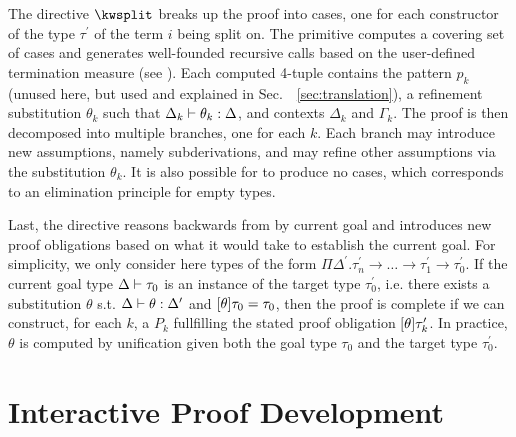 %

The directive $\kwsplit$ breaks up the proof into cases, one for each
constructor of the type $\tau^\prime$ of the term $i$ being split on.
The \scov{} primitive computes a covering set of cases and generates
well-founded recursive calls based on the user-defined termination measure
(see \cite{Pientka:TLCA15}).
Each computed 4-tuple contains the pattern $p_k$ (unused here, but used and
explained in Sec.~~\ref{sec:translation}), a refinement substitution $\theta_k$
such that $\Delta_k \vdash \theta_k : \Delta$, and contexts $\Delta_k$ and
$\Gamma_k$.
The proof is then decomposed into multiple branches, one for each $k$.
Each branch may introduce new assumptions, namely subderivations, and may refine
other assumptions via the substitution $\theta_k$.
It is also possible for \kwsplit{} to produce no cases, which corresponds to an
elimination principle for empty types.

Last, the \kwsuffices{} directive reasons backwards from by
current goal and introduces new proof obligations based on what it
would take to establish the current goal.
For simplicity, we only consider here types of the form
$\Pi \Delta^\prime.\tau_n^\prime \to \ldots \to \tau_1^\prime \to \tau_0^\prime$.
If the current goal type $\Delta \vdash \tau_0$ is an instance of the target type
$\tau_0^\prime$, i.e. there exists a substitution $\theta$
s.t. $\Delta \vdash \theta : \Delta^\prime$ and $[\theta]\tau_0
= \tau_0$, then the proof is complete if we can construct, for each $k$, a $P_k$
fullfilling the stated proof obligation $[\theta]\tau^\prime_k$. In practice, $\theta$ is
computed by unification given both the goal type $\tau_0$ and the
target type $\tau_0^\prime$.

\section{Interactive Proof Development}
\label{sec:harpoon-actions}

